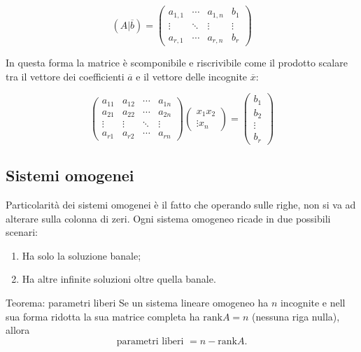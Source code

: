 \documentclass[x11names]{article}
\begin{document}
\[
\left(A|\overline{b}\right)=
\left(\begin{array}{ccc|c}
a_{1,1}&\cdots &a_{1,n}&b_{1} \\ \vdots &\ddots &\vdots  &\vdots \\ a_{r,1}&\cdots &a_{r,n}&b_{r}
\end{array}\right)
\] 

In questa forma la matrice è scomponibile e riscrivibile come il prodotto scalare tra il vettore dei coefficienti $\overline{a}$ e il vettore delle incognite $\overline{x}$:

\[
\begin{pmatrix}
a_{11}&a_{12}&\cdots &a_{1n}\\
a_{21}&a_{22}&\cdots &a_{2n}\\
\vdots &\vdots &\ddots &\vdots\\ 
a_{r1}&a_{r2}&\cdots &a_{rn}
\end{pmatrix}
\begin{pmatrix}x_{1}x_{2}\\
\vdots x_{n}
\end{pmatrix}=
\begin{pmatrix}
b_{1} \\
b_{2} \\
\vdots\\ 
b_{r}
\end{pmatrix}
\]

\subsection{Sistemi omogenei}
Particolarità dei sistemi omogenei è il fatto che operando sulle righe, non si va ad alterare sulla colonna di zeri. Ogni sistema omogeneo ricade in due possibili scenari:

\begin{enumerate}
 	\item Ha solo la soluzione banale;
	 \item Ha altre infinite soluzioni oltre quella banale.
\end{enumerate}


\begin{center}
\colorbox{myred}{\begin{minipage}{5.75in}
\begin{redes}{Teorema: parametri liberi}
Se un sistema lineare omogeneo ha $n$ incognite e nell sua forma ridotta la sua matrice completa ha  $\text{rank}A = n$ (nessuna riga nulla), allora
\[
\text{parametri liberi } = n - \text{rank}A
.\] 
\end{redes}
\end{minipage}}        
\end{center}
\end{document}

